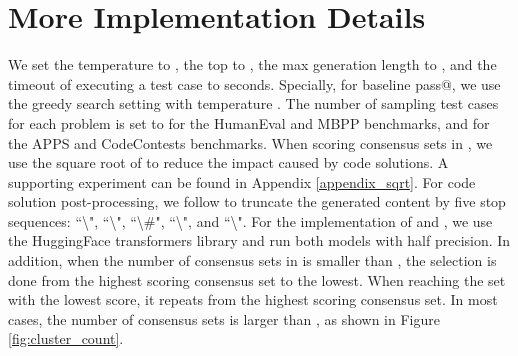 \appendix

\section{More Implementation Details}
\label{sec:appendix_detail}
We set the temperature to , the top  to , the max generation length to , and the timeout of executing a test case to  seconds. Specially, for baseline pass@, we use the greedy search setting with temperature . The number of sampling test cases for each problem is set to  for the HumanEval and MBPP benchmarks, and  for the APPS and CodeContests benchmarks. When scoring consensus sets in \ours, we use the square root of  to reduce the impact caused by code solutions. A supporting experiment can be found in Appendix \ref{appendix_sqrt}. For code solution post-processing, we follow \cite{chen2021evaluating} to truncate the generated content by five stop sequences: ``\textbackslash", ``\textbackslash", ``\textbackslash \#", ``\textbackslash", and ``\textbackslash".  
For the implementation of \incoder and \codegen, 
we use the HuggingFace transformers library \citep{Wolf2019HuggingFacesTS} and run both models with half precision.  
In addition, when the number of consensus sets in \ours is smaller than , the selection is done from the highest scoring consensus set to the lowest. When reaching the set with the lowest score, it repeats from the highest scoring consensus set. In most cases, the number of consensus sets is larger than , as shown in Figure \ref{fig:cluster_count}.

